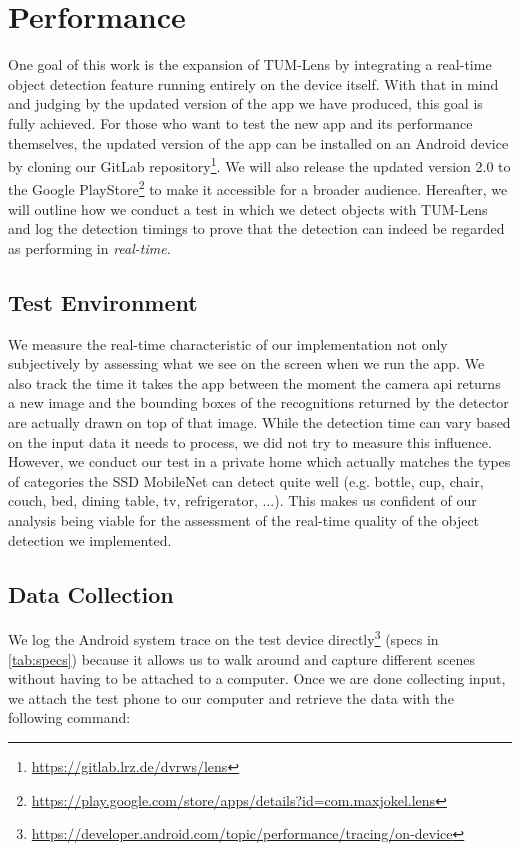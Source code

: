 \documentclass[
			   fontsize=11pt,
               paper=a4,
               bibliography=totoc,
               idxtotoc,
               headsepline,
               footsepline,
               footinclude=false,
               BCOR=12mm,
               DIV=13,
               openany,   %
               ]
               {scrbook}
\begin{document}
\section{Performance} \label{sec:performance}

One goal of this work is the expansion of TUM-Lens by integrating a real-time object detection feature running entirely on the device itself. With that in mind and judging by the updated version of the app we have produced, this goal is fully achieved. For those who want to test the new app and its performance themselves, the updated version of the app can be installed on an Android device by cloning our GitLab repository\footnote{\url{https://gitlab.lrz.de/dvrws/lens}}. We will also release the updated version 2.0 to the Google PlayStore\footnote{\url{https://play.google.com/store/apps/details?id=com.maxjokel.lens}} to make it accessible for a broader audience. Hereafter, we will outline how we conduct a test in which we detect objects with TUM-Lens and log the detection timings to prove that the detection can indeed be regarded as performing in \textit{real-time}.

\subsection{Test Environment}
We measure the real-time characteristic of our implementation not only subjectively by assessing what we see on the screen when we run the app. We also track the time it takes the app between the moment the camera \gls{api} returns a new image and the bounding boxes of the recognitions returned by the detector are actually drawn on top of that image. While the detection time can vary based on the input data it needs to process, we did not try to measure this influence. However, we conduct our test in a private home which actually matches the types of categories the SSD MobileNet can detect quite well (e.g. bottle, cup, chair, couch, bed, dining table, tv, refrigerator, ...). This makes us confident of our analysis being viable for the assessment of the real-time quality of the object detection we implemented.

\subsection{Data Collection}
We log the Android system trace on the test device directly\footnote{\url{https://developer.android.com/topic/performance/tracing/on-device}} (specs in \autoref{tab:specs}) because it allows us to walk around and capture different scenes without having to be attached to a computer. Once we are done collecting input, we attach the test phone to our computer and retrieve the data with the following command:
\end{document}
